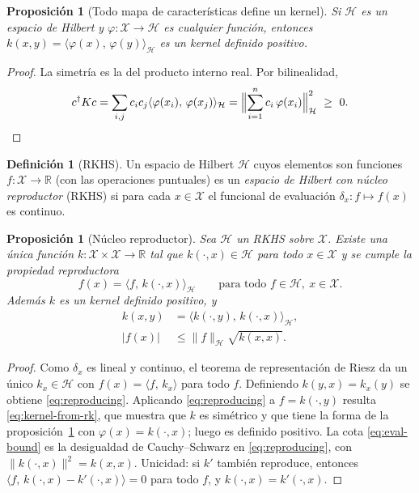 \documentclass[11pt,a4paper]{article}
\newcommand{\R}{\mathbb{R}}
\newcommand{\X}{\mathcal{X}}
\newcommand{\Hk}{\mathcal{H}}
\newcommand{\dg}{\dagger}                         %
\newcommand{\inner}[2]{\langle #1,\, #2\rangle}
\newcommand{\norm}[1]{\lVert #1\rVert}
\newcommand{\abs}[1]{\lvert #1\rvert}
\theoremstyle{plain}
\newtheorem{proposicion}[teorema]{Proposición}
\theoremstyle{definition}
\newtheorem{definicion}[teorema]{Definición}
\theoremstyle{remark}
\numberwithin{equation}{section}
\begin{document}
\begin{proposicion}[Todo mapa de características define un kernel]\label{prop:feature}
Si $\Hk$ es un espacio de Hilbert y $\varphi\colon\X\to\Hk$ es cualquier función, entonces
$k(x,y)=\inner{\varphi(x)}{\varphi(y)}_{\Hk}$ es un kernel definido positivo.
\end{proposicion}
\begin{proof}
La simetría es la del producto interno real. Por bilinealidad,
\begin{equation}\label{eq:feature-kernel}
  c^{\dg}Kc=\sum_{i,j}c_i c_j\inner{\varphi(x_i)}{\varphi(x_j)}_{\Hk}
  =\Bigl\lVert\sum_{i=1}^n c_i\,\varphi(x_i)\Bigr\rVert_{\Hk}^2\ \ge\ 0. \qedhere
\end{equation}
\end{proof}

\begin{definicion}[RKHS]
Un espacio de Hilbert $\Hk$ cuyos elementos son funciones $f\colon\X\to\R$ (con las
operaciones puntuales) es un \emph{espacio de Hilbert con núcleo reproductor} (RKHS) si para
cada $x\in\X$ el funcional de evaluación $\delta_x\colon f\mapsto f(x)$ es continuo.
\end{definicion}

\begin{proposicion}[Núcleo reproductor]\label{prop:nucleo}
Sea $\Hk$ un RKHS sobre $\X$. Existe una única función $k\colon\X\times\X\to\R$ tal que
$k(\cdot,x)\in\Hk$ para todo $x\in\X$ y se cumple la \emph{propiedad reproductora}
\begin{equation}\label{eq:reproducing}
  f(x)=\inner{f}{k(\cdot,x)}_{\Hk}\qquad\text{para todo } f\in\Hk,\ x\in\X .
\end{equation}
Además $k$ es un kernel definido positivo, y
\begin{align}
  k(x,y) &= \inner{k(\cdot,y)}{k(\cdot,x)}_{\Hk}, \label{eq:kernel-from-rk}\\
  \abs{f(x)} &\le \norm{f}_{\Hk}\sqrt{k(x,x)}. \label{eq:eval-bound}
\end{align}
\end{proposicion}
\begin{proof}
Como $\delta_x$ es lineal y continuo, el teorema de representación de Riesz da un único
$k_x\in\Hk$ con $f(x)=\inner{f}{k_x}$ para todo $f$. Definiendo $k(y,x)=k_x(y)$ se obtiene
\eqref{eq:reproducing}. Aplicando \eqref{eq:reproducing} a $f=k(\cdot,y)$ resulta
\eqref{eq:kernel-from-rk}, que muestra que $k$ es simétrico y que tiene la forma de la
proposición~\ref{prop:feature} con $\varphi(x)=k(\cdot,x)$; luego es definido positivo.
La cota \eqref{eq:eval-bound} es la desigualdad de Cauchy--Schwarz en \eqref{eq:reproducing},
con $\norm{k(\cdot,x)}^2=k(x,x)$. Unicidad: si $k'$ también reproduce, entonces
$\inner{f}{k(\cdot,x)-k'(\cdot,x)}=0$ para todo $f$, y $k(\cdot,x)=k'(\cdot,x)$.
\end{proof}
\end{document}
